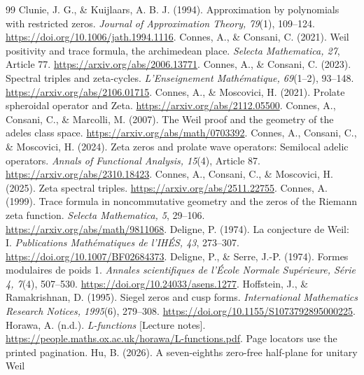 \begin{thebibliography}{99}
Clunie, J. G., \& Kuijlaars, A. B. J. (1994).
Approximation by polynomials with restricted zeros.
\emph{Journal of Approximation Theory, 79}(1), 109--124.
\url{https://doi.org/10.1006/jath.1994.1116}.
Connes, A., \& Consani, C. (2021). Weil positivity and trace formula,
the archimedean place. \emph{Selecta Mathematica, 27}, Article 77.
\url{https://arxiv.org/abs/2006.13771}.
Connes, A., \& Consani, C. (2023). Spectral triples and zeta-cycles.
\emph{L'Enseignement Math\'ematique, 69}(1--2), 93--148.
\url{https://arxiv.org/abs/2106.01715}.
Connes, A., \& Moscovici, H. (2021). Prolate spheroidal operator and
Zeta. \url{https://arxiv.org/abs/2112.05500}.
Connes, A., Consani, C., \& Marcolli, M. (2007). The Weil proof and
the geometry of the adeles class space. \url{https://arxiv.org/abs/math/0703392}.
Connes, A., Consani, C., \& Moscovici, H. (2024). Zeta zeros and
prolate wave operators: Semilocal adelic operators.
\emph{Annals of Functional Analysis, 15}(4), Article 87.
\url{https://arxiv.org/abs/2310.18423}.
Connes, A., Consani, C., \& Moscovici, H. (2025). Zeta spectral triples.
\url{https://arxiv.org/abs/2511.22755}.
Connes, A. (1999). Trace formula in noncommutative geometry and the
zeros of the Riemann zeta function. \emph{Selecta Mathematica, 5},
29--106. \url{https://arxiv.org/abs/math/9811068}.
Deligne, P. (1974). La conjecture de Weil: I.
\emph{Publications Math\'ematiques de l'IH\'ES, 43}, 273--307.
\url{https://doi.org/10.1007/BF02684373}.
Deligne, P., \& Serre, J.-P. (1974). Formes modulaires de poids 1.
\emph{Annales scientifiques de l'\'Ecole Normale Sup\'erieure,
S\'erie 4, 7}(4), 507--530.
\url{https://doi.org/10.24033/asens.1277}.
Hoffstein, J., \& Ramakrishnan, D. (1995). Siegel zeros and cusp forms.
\emph{International Mathematics Research Notices, 1995}(6), 279--308.
\url{https://doi.org/10.1155/S1073792895000225}.
Horawa, A. (n.d.). \emph{L-functions} [Lecture notes].
\url{https://people.maths.ox.ac.uk/horawa/L-functions.pdf}.
Page locators use the printed pagination.
Hu, B. (2026). A seven-eighths zero-free half-plane for unitary Weil

\end{thebibliography}
